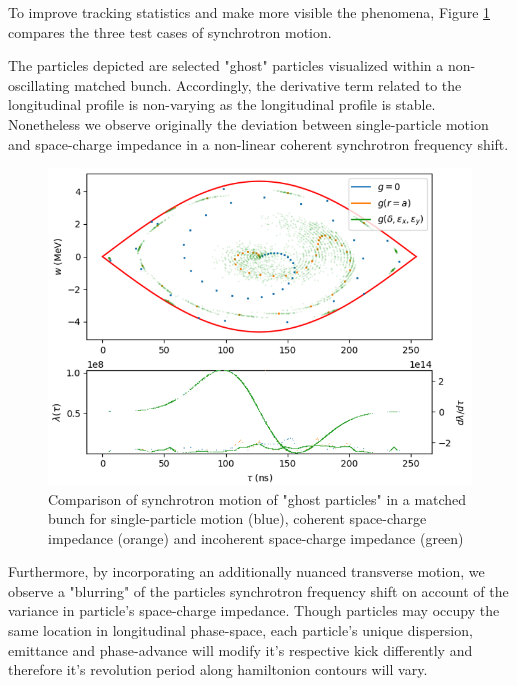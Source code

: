 To improve tracking statistics and make more visible the phenomena, Figure \ref{fig:full_comparison} compares the three test cases of synchrotron motion.

The particles depicted are selected "ghost" particles visualized within a non-oscillating matched bunch. Accordingly, the derivative term related to the longitudinal profile is non-varying as the longitudinal profile is stable. Nonetheless we observe originally the deviation between single-particle motion and space-charge impedance in a non-linear coherent synchrotron frequency shift.

\begin{figure}
    \centering
    \includegraphics{figs/tune_blurr/trajectories.png}
    \caption{Comparison of synchrotron motion of "ghost particles" in a matched bunch for single-particle motion (blue), coherent space-charge impedance (orange) and incoherent space-charge impedance (green)}
    \label{fig:full_comparison}
\end{figure}

Furthermore, by incorporating an additionally nuanced transverse motion, we observe a "blurring" of the particles synchrotron frequency shift on account of the variance in particle's space-charge impedance. Though particles may occupy the same location in longitudinal phase-space, each particle's unique dispersion, emittance and phase-advance will modify it's respective kick differently and therefore it's revolution period along hamiltonion contours will vary.

